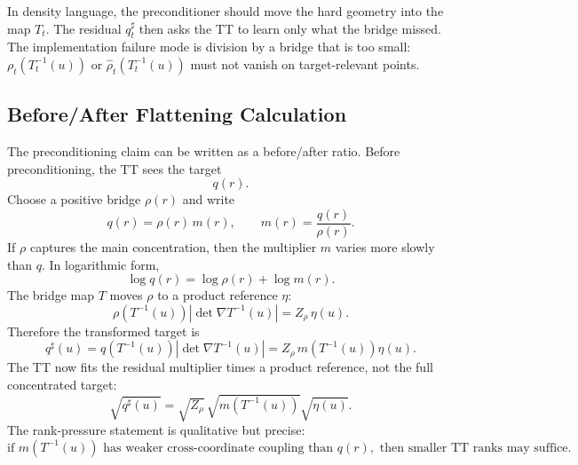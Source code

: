 \documentclass[11pt]{article}
\numberwithin{equation}{section}
\begin{document}
In density language, the preconditioner should move the hard geometry into the
map \(T_t\).  The residual \(q_t^\sharp\) then asks the TT to learn only what
the bridge missed.  The implementation failure mode is division by a bridge
that is too small: \(\rho_t(T_t^{-1}(u))\) or \(\widehat\rho_t(T_t^{-1}(u))\)
must not vanish on target-relevant points.

\subsection*{Before/After Flattening Calculation}

The preconditioning claim can be written as a before/after ratio.  Before
preconditioning, the TT sees the target
\begin{equation}
    q(r).
    \label{eq:p24-p23-prec1}
\end{equation}
Choose a positive bridge \(\rho(r)\) and write
\begin{equation}
    q(r)=\rho(r)\,m(r),
    \qquad
    m(r)=\frac{q(r)}{\rho(r)}.
    \label{eq:p24-p23-prec2}
\end{equation}
If \(\rho\) captures the main concentration, then the multiplier \(m\) varies
more slowly than \(q\).  In logarithmic form,
\begin{equation}
    \log q(r)=\log\rho(r)+\log m(r).
    \label{eq:p24-p23-prec3}
\end{equation}
The bridge map \(T\) moves \(\rho\) to a product reference \(\eta\):
\begin{equation}
    \rho(T^{-1}(u))\left|\det\nabla T^{-1}(u)\right|
    =
    Z_\rho\,\eta(u).
    \label{eq:p24-p23-prec4}
\end{equation}
Therefore the transformed target is
\begin{equation}
    q^\sharp(u)
    =
    q(T^{-1}(u))\left|\det\nabla T^{-1}(u)\right|
    =
    Z_\rho\,m(T^{-1}(u))\eta(u).
    \label{eq:p24-p23-prec5}
\end{equation}
The TT now fits the residual multiplier times a product reference, not the
full concentrated target:
\begin{equation}
    \sqrt{q^\sharp(u)}
    =
    \sqrt{Z_\rho}\,
    \sqrt{m(T^{-1}(u))}
    \sqrt{\eta(u)}.
    \label{eq:p24-p23-prec6}
\end{equation}
The rank-pressure statement is qualitative but precise:
\begin{equation}
    \text{if }m(T^{-1}(u))\text{ has weaker cross-coordinate coupling than }q(r),
    \text{ then smaller TT ranks may suffice.}
    \label{eq:p24-p23-prec7}
\end{equation}
\end{document}

